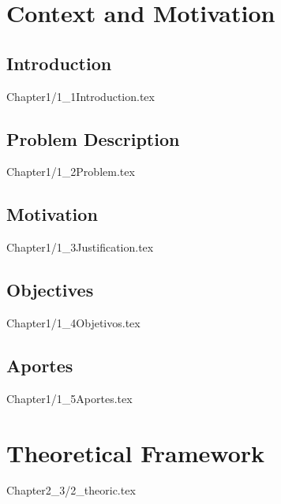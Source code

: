 \documentclass{report}
\begin{document}


\tableofcontents

\chapter{Context and Motivation}

\section{Introduction}
{Chapter1/1_1Introduction.tex}

\section{Problem Description}
{Chapter1/1_2Problem.tex}

\section{Motivation}
{Chapter1/1_3Justification.tex}

\section{Objectives}
{Chapter1/1_4Objetivos.tex}

\section{Aportes}
{Chapter1/1_5Aportes.tex}


\chapter{Theoretical Framework}
{Chapter2_3/2_theoric.tex}
\end{document}

